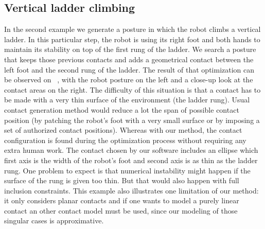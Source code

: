 \subsection{Vertical ladder climbing}
\label{subsec:ladder}

In the second example we generate a posture in which the robot climbs a vertical ladder.
In this particular step, the robot is using its right foot and both hands to maintain its stability on top of the first rung of the ladder. We search a posture that keeps those previous contacts and adds a geometrical contact between the left foot and the second rung of the ladder.
The result of that optimization can be observed on ~, with the robot posture on the left and a close-up look at the contact areas on the right.
The difficulty of this situation is that a contact has to be made with a very thin surface of the environment (the ladder rung). Usual contact generation method would reduce a lot the span of possible contact position (by patching the robot's foot with a very small surface or by imposing a set of authorized contact positions).
Whereas with our method, the contact configuration is found during the optimization process without requiring any extra human work. The contact chosen by our software includes an ellipse which first axis is the width of the robot's foot and second axis is as thin as the ladder rung.   
One problem to expect is that numerical instability might happen if the surface of the rung is given too thin. But that would also happen with full inclusion constraints.
This example also illustrates one limitation of our method: it only considers planar contacts and if one wants to model a purely linear contact an other contact model must be used, since our modeling of those singular cases is approximative.


